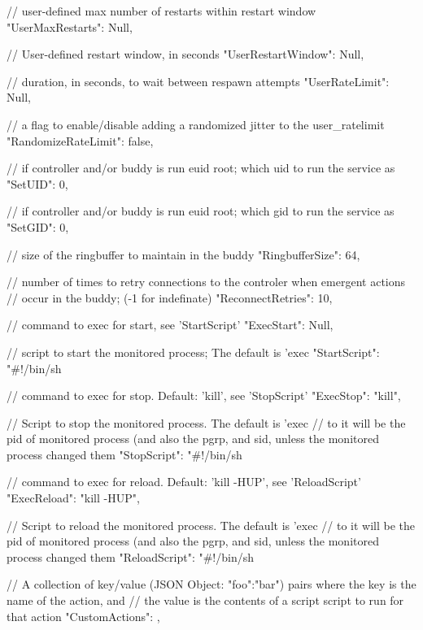\begin{DoxyVerb}
{{        // user-defined max number of restarts within restart window
        "UserMaxRestarts": Null,

        // User-defined restart window, in seconds
        "UserRestartWindow": Null,

        // duration, in seconds, to wait between respawn attempts
        "UserRateLimit": Null,

        // a flag to enable/disable adding a randomized jitter to the user_ratelimit
        "RandomizeRateLimit": false,

        // if controller and/or buddy is run euid root; which uid to run the service as
        "SetUID": 0,

        // if controller and/or buddy is run euid root; which gid to run the service as
        "SetGID": 0,

        // size of the ringbuffer to maintain in the buddy
        "RingbufferSize": 64,

        // number of times to retry connections to the controler when emergent actions
        // occur in the buddy; (-1 for indefinate)
        "ReconnectRetries": 10,

        // command to exec for start, see 'StartScript'
        "ExecStart": Null,

        // script to start the monitored process; The default is 'exec %
        "StartScript": "#!/bin/sh\nexec %

        // command to exec for stop. Default: 'kill', see 'StopScript'
        "ExecStop": "kill",

        // Script to stop the monitored process. The default is 'exec %
        // to it will be the pid of monitored process (and also the pgrp, and sid, unless the monitored process changed them
        "StopScript": "#!/bin/sh\nexec %

        // command to exec for reload. Default: 'kill -HUP', see 'ReloadScript'
        "ExecReload": "kill -HUP",

        // Script to reload the monitored process. The default is 'exec %
        // to it will be the pid of monitored process (and also the pgrp, and sid, unless the monitored process changed them
        "ReloadScript": "#!/bin/sh\nexec %

        // A collection of key/value (JSON Object: {"foo":"bar"}) pairs where the key is the name of the action, and
        // the value is the contents of a script script to run for that action
        "CustomActions": {},

}}
\end{DoxyVerb}
